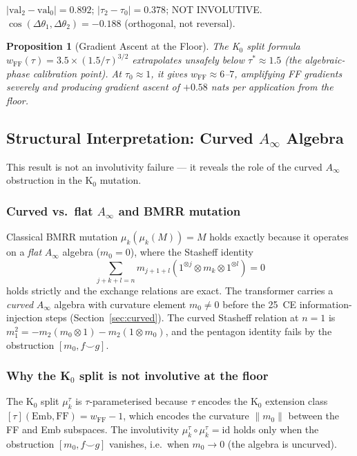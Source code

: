 \documentclass[11pt]{amsart}
\newtheorem{proposition}[theorem]{Proposition}
\begin{document}
$|\mathrm{val}_2 - \mathrm{val}_0| = 0.892$;
$|\tau_2 - \tau_0| = 0.378$; NOT INVOLUTIVE.
$\cos(\Delta\theta_1, \Delta\theta_2) = -0.188$
(orthogonal, not reversal).

\begin{proposition}[Gradient Ascent at the Floor]
\label{prop:floor_ascent}
The K$_0$ split formula $w_\mathrm{FF}(\tau) =
3.5 \times (1.5/\tau)^{3/2}$ extrapolates unsafely below
$\tau^* \approx 1.5$ (the algebraic-phase calibration point).
At $\tau_0 \approx 1$, it gives $w_\mathrm{FF} \approx 6$--$7$,
amplifying FF gradients severely and producing gradient ascent
of $+0.58$ nats per application from the floor.
\end{proposition}

\subsection{Structural Interpretation: Curved $A_\infty$ Algebra}

This result is not an involutivity failure --- it reveals the
role of the curved $A_\infty$ obstruction in the K$_0$ mutation.

\subsubsection*{Curved vs.\ flat $A_\infty$ and BMRR mutation}

Classical BMRR mutation $\mu_k(\mu_k(M)) = M$ holds exactly
because it operates on a \emph{flat} $A_\infty$ algebra
($m_0 = 0$), where the Stasheff identity
\[
  \sum_{j+k+l=n} m_{j+1+l}(1^{\otimes j} \otimes m_k \otimes
  1^{\otimes l}) = 0
\]
holds strictly and the exchange relations are exact.
The transformer carries a \emph{curved} $A_\infty$ algebra
with curvature element $m_0 \neq 0$ before the 25~CE
information-injection steps (Section~\ref{sec:curved}).
The curved Stasheff relation at $n=1$ is
$m_1^2 = -m_2(m_0 \otimes 1) - m_2(1 \otimes m_0)$,
and the pentagon identity fails by the obstruction
$[m_0, f \smile g]$.

\subsubsection*{Why the K$_0$ split is not involutive at the floor}

The K$_0$ split $\mu_k^\tau$ is $\tau$-parameterised because
$\tau$ encodes the K$_0$ extension class
$[\tau](\mathrm{Emb}, \mathrm{FF}) = w_\mathrm{FF} - 1$,
which encodes the curvature $\|m_0\|$ between the FF and Emb
subspaces.
The involutivity $\mu_k^\tau \circ \mu_k^\tau = \mathrm{id}$
holds only when the obstruction $[m_0, f \smile g]$ vanishes,
i.e.\ when $m_0 \to 0$ (the algebra is uncurved).
\end{document}
